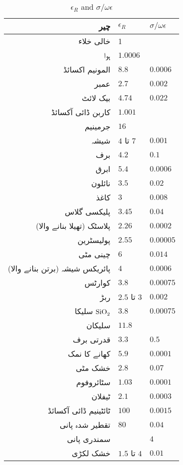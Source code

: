 {\renewcommand{\arraystretch}{1.2}
\begin{table}
\caption{$\epsilon_R$ and $\sigma/\omega \epsilon$}
\centering
\begin{tabular}{r | l | l}
\hline
چیر & $\epsilon_R$ & $\sigma/\omega \epsilon$\\
\hline
خالی خلاء & 1 &  \\
ہوا&  $\num{1.0006}$&  \\
المونیم اکسائڈ  & $\num{8.8}$ & $\num{0.0006}$\\
عمبر  & $\num{2.7}$& $\num{0.002}$ \\
بیک لائٹ  & $\num{4.74}$& $\num{0.022}$ \\
کاربن ڈائی آکسائڈ &$\num{1.001}$&\\
جرمینیم&$\num{16}$&\\
شیشہ & $4$ تا $7$ & $\num{0.001}$\\
برف & $\num{4.2}$& $\num{0.1}$ \\
ابرق   & $\num{5.4}$ & $\num{0.0006}$\\
نائلون  & $\num{3.5}$ & $\num{0.02}$\\
کاغذ  & $\num{3}$ & $\num{0.008}$\\
پلیکسی گلاس  & $\num{3.45}$ & $\num{0.04}$\\
پلاسٹک (تھیلا بنانے والا)   & $\num{2.26}$ & $\num{0.0002}$ \\
پولیسٹرین & $\num{2.55}$ & $\num{0.00005}$ \\
چینی مٹی & $\num{6}$ & $\num{0.014}$ \\
پائریکس شیشہ (برتن بنانے والا)  & $\num{4}$& $\num{0.0006}$ \\
کوارٹس  & $\num{3.8}$ & $\num{0.00075}$ \\
ربڑ & $2.5$ تا $3$ & $\num{0.002}$\\
سلیکا  $\ce{SiO2}$ & $\num{3.8}$ & $\num{0.00075}$ \\
سلیکان& $\num{11.8}$ &  \\
قدرتی برف& $\num{3.3}$ & $\num{0.5}$ \\
کھانے کا نمک& $\num{5.9}$ & $\num{0.0001}$ \\
خشک مٹی& $\num{2.8}$ & $\num{0.07}$ \\
سٹائروفوم  & $\num{1.03}$ & $\num{0.0001}$ \\
ٹیفلان & $\num{2.1}$ & $\num{0.0003}$ \\
ٹائٹینیم ڈائی آکسائڈ & $\num{100}$ & $\num{0.0015}$ \\
تقطیر شدہ پانی & $\num{80}$ & $\num{0.04}$ \\
سمندری پانی&  & $\num{4}$ \\
خشک لکڑی&$1.5$ تا $4$ & $\num{0.01}$ \\
\end{tabular}
\label{جدول_جدول_جزوی_برقی_مستقل_زاویہ_زیاع}
\end{table}
}

